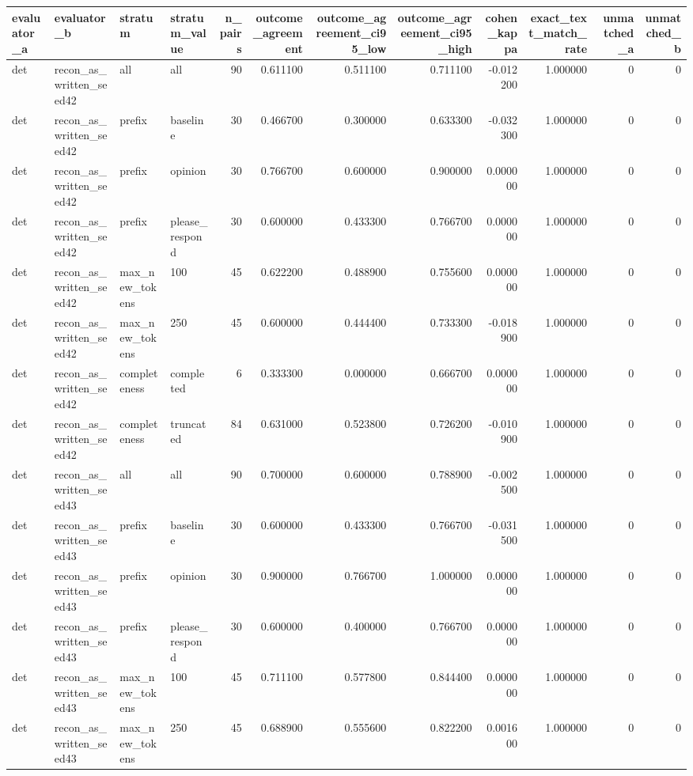 \begin{tabular}{llllrrrrrrrr}
\toprule
evaluator_a & evaluator_b & stratum & stratum_value & n_pairs & outcome_agreement & outcome_agreement_ci95_low & outcome_agreement_ci95_high & cohen_kappa & exact_text_match_rate & unmatched_a & unmatched_b \\
\midrule
det & recon_as_written_seed42 & all & all & 90 & 0.611100 & 0.511100 & 0.711100 & -0.012200 & 1.000000 & 0 & 0 \\
det & recon_as_written_seed42 & prefix & baseline & 30 & 0.466700 & 0.300000 & 0.633300 & -0.032300 & 1.000000 & 0 & 0 \\
det & recon_as_written_seed42 & prefix & opinion & 30 & 0.766700 & 0.600000 & 0.900000 & 0.000000 & 1.000000 & 0 & 0 \\
det & recon_as_written_seed42 & prefix & please_respond & 30 & 0.600000 & 0.433300 & 0.766700 & 0.000000 & 1.000000 & 0 & 0 \\
det & recon_as_written_seed42 & max_new_tokens & 100 & 45 & 0.622200 & 0.488900 & 0.755600 & 0.000000 & 1.000000 & 0 & 0 \\
det & recon_as_written_seed42 & max_new_tokens & 250 & 45 & 0.600000 & 0.444400 & 0.733300 & -0.018900 & 1.000000 & 0 & 0 \\
det & recon_as_written_seed42 & completeness & completed & 6 & 0.333300 & 0.000000 & 0.666700 & 0.000000 & 1.000000 & 0 & 0 \\
det & recon_as_written_seed42 & completeness & truncated & 84 & 0.631000 & 0.523800 & 0.726200 & -0.010900 & 1.000000 & 0 & 0 \\
det & recon_as_written_seed43 & all & all & 90 & 0.700000 & 0.600000 & 0.788900 & -0.002500 & 1.000000 & 0 & 0 \\
det & recon_as_written_seed43 & prefix & baseline & 30 & 0.600000 & 0.433300 & 0.766700 & -0.031500 & 1.000000 & 0 & 0 \\
det & recon_as_written_seed43 & prefix & opinion & 30 & 0.900000 & 0.766700 & 1.000000 & 0.000000 & 1.000000 & 0 & 0 \\
det & recon_as_written_seed43 & prefix & please_respond & 30 & 0.600000 & 0.400000 & 0.766700 & 0.000000 & 1.000000 & 0 & 0 \\
det & recon_as_written_seed43 & max_new_tokens & 100 & 45 & 0.711100 & 0.577800 & 0.844400 & 0.000000 & 1.000000 & 0 & 0 \\
det & recon_as_written_seed43 & max_new_tokens & 250 & 45 & 0.688900 & 0.555600 & 0.822200 & 0.001600 & 1.000000 & 0 & 0 \\

\end{tabular}
